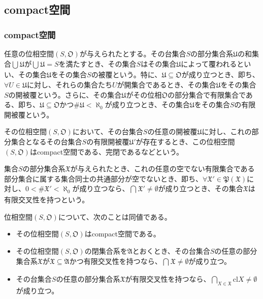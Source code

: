 \documentclass[dvipdfmx]{jsarticle}
\begin{document}
\subsection{compact空間}%
\subsubsection{compact空間}%
\begin{dfn}
任意の位相空間$\left( S,\mathfrak{O} \right)$が与えられたとする。その台集合$S$の部分集合系$\mathfrak{U}$の和集合$\bigcup_{} \mathfrak{U}$が$\bigcup_{} \mathfrak{U} = S$を満たすとき、その集合$S$はその集合$\mathfrak{U}$によって覆われるといい、その集合$\mathfrak{U}$をその集合$S$の被覆という。特に、$\mathfrak{U \subseteq O}$が成り立つとき、即ち、$\forall U \in \mathfrak{U}$に対し、それらの集合たち$U$が開集合であるとき、その集合$\mathfrak{U}$をその集合$S$の開被覆という。さらに、その集合$\mathfrak{U}$がその位相$\mathfrak{O}$の部分集合で有限集合である、即ち、$\mathfrak{U \subseteq O}$かつ${\#}\mathfrak{U} < \aleph_{0}$が成り立つとき、その集合$\mathfrak{U}$をその集合$S$の有限開被覆という。
\end{dfn}
\begin{dfn}
その位相空間$\left( S,\mathfrak{O} \right)$において、その台集合$S$の任意の開被覆$\mathfrak{U}$に対し、これの部分集合となるその台集合$S$の有限開被覆$\mathfrak{U}'$が存在するとき、この位相空間$\left( S,\mathfrak{O} \right)$はcompact空間である、完閉であるなどという。
\end{dfn}
\begin{dfn}\label{有限交叉性}
集合$S$の部分集合系$\mathfrak{X}$が与えられたとき、これの任意の空でない有限集合である部分集合に属する集合同士の共通部分が空でないとき、即ち、$\forall\mathfrak{X}'\in \mathfrak{P}\left( \mathfrak{X} \right)$に対し、$0 < {\#}\mathfrak{X}' < \aleph_{0}$が成り立つなら、$\bigcap_{} \mathfrak{X}' \neq \emptyset$が成り立つとき、その集合$\mathfrak{X}$は有限交叉性を持つという。
\end{dfn}
\begin{thm}\label{8.1.6.1}
位相空間$\left( S,\mathfrak{O} \right)$について、次のことは同値である。
\begin{itemize}
\item
  その位相空間$\left( S,\mathfrak{O} \right)$はcompact空間である。
\item
  その位相空間$\left( S,\mathfrak{O} \right)$の閉集合系を$\mathfrak{A}$とおくとき、その台集合$S$の任意の部分集合系$\mathfrak{X}$が$\mathfrak{X \subseteq A}$かつ有限交叉性を持つなら、$\bigcap_{} \mathfrak{X} \neq \emptyset$が成り立つ。
\item
  その台集合$S$の任意の部分集合系$\mathfrak{X}$が有限交叉性を持つなら、$\bigcap_{X \in \mathfrak{X}} {{\mathrm{cl}}X} \neq \emptyset$が成り立つ。
\end{itemize}
\end{thm}
\end{document}
